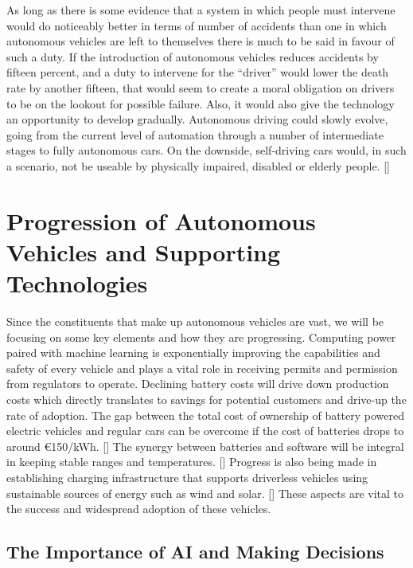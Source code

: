 \documentclass{article}
\begin{document}
As long as there is some evidence that a system in which people must intervene would do noticeably better in terms of number of accidents than one in which autonomous vehicles are left to themselves there is much to be said in favour of such a duty. If the introduction of autonomous vehicles reduces accidents by fifteen percent, and a duty to intervene for the “driver” would lower the death rate by another fifteen, that would seem to create a moral obligation on drivers to be on the lookout for possible failure. Also, it would also give the technology an opportunity to develop gradually. Autonomous driving could slowly evolve, going from the current level of automation through a number of intermediate stages to fully autonomous cars. On the downside, self-driving cars would, in such a scenario, not be useable by physically impaired, disabled or elderly people. [\textcite{hevelke2015responsibility}]


\section{Progression of Autonomous Vehicles and Supporting Technologies}

Since the constituents that make up autonomous vehicles are vast, we will be focusing on some key elements and how they are progressing. Computing power paired with machine learning is exponentially improving the capabilities and safety of every vehicle and plays a vital role in receiving permits and permission from regulators to operate. Declining battery costs will drive down production costs which directly translates to savings for potential customers and drive-up the rate of adoption. The gap between the total cost of ownership of battery powered electric vehicles and regular cars can be overcome if the cost of batteries drops to around
€150/kWh. [\textcite{van2011energy}] The synergy between batteries and software will be integral in keeping stable ranges and temperatures. [\textcite{ali2019towards}] Progress is also being made in establishing charging infrastructure that supports driverless vehicles using sustainable sources of energy such as wind and solar. [\textcite{nunes2015day}] These aspects are vital to the success and widespread adoption of these vehicles.  

\subsection{The Importance of AI and Making Decisions}
\end{document}
